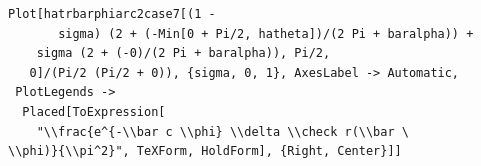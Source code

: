 \documentclass[reqno]{amsart}
\theoremstyle{definition} \newtheorem{definition}{Definition}[section]
\theoremstyle{definition} \newtheorem{remark}[definition]{Remark}
\theoremstyle{plain} \newtheorem{lemma}[definition]{Lemma}
\theoremstyle{plain} \newtheorem{proposition}[definition]{Proposition}
\theoremstyle{plain} \newtheorem{theorem}[definition]{Theorem}
\theoremstyle{plain} \newtheorem{corollary}[definition]{Corollary}
\theoremstyle{definition} \newtheorem{example}[definition]{Example}
\theoremstyle{plain} \newtheorem{claim}[clai]{Claim}
\theoremstyle{definition} \newtheorem{assumption}[definition]{Assumption}
\theoremstyle{definition} \newtheorem{observation}[definition]{Observation}
\newcommand{\1}{\mathbbm 1}
\newcommand{\sbig}{\bigskip}
\numberwithin{equation}{section} %
\theoremstyle{plain} \newtheorem*{theorem*}{Theorem}
\theoremstyle{plain} \newtheorem{mthm}[maintheorem]{Main Theorem}
\theoremstyle{plain} \newtheorem*{mthm*}{Main Theorem}
\theoremstyle{plain} \newtheorem*{conjecture*}{Conjecture}
\theoremstyle{plain} \newtheorem{conjecture}[definition]{Conjecture}
\theoremstyle{plain} \newtheorem*{problem*}{Problem}
\begin{document}
\begin{verbatim}
Plot[hatrbarphiarc2case7[(1 - 
       sigma) (2 + (-Min[0 + Pi/2, hatheta])/(2 Pi + baralpha)) + 
    sigma (2 + (-0)/(2 Pi + baralpha)), Pi/2, 
   0]/(Pi/2 (Pi/2 + 0)), {sigma, 0, 1}, AxesLabel -> Automatic, 
 PlotLegends -> 
  Placed[ToExpression[
    "\\frac{e^{-\\bar c \\phi} \\delta \\check r(\\bar \
\\phi)}{\\pi^2}", TeXForm, HoldForm], {Right, Center}]]
\end{verbatim}

\sbig
\end{document}
